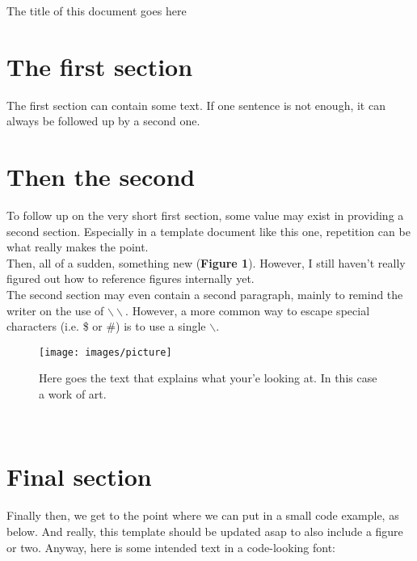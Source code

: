 \documentclass[12pt]{article} %
\begin{document}
\begin{center}
\LARGE{The title of this document goes here}
\end{center}

\vspace{5mm} %

\section*{The first section} %
The first section can contain some text. If one sentence is not enough, it can always be followed up by a second one.\\

\section*{Then the second}
To follow up on the very short first section, some value may exist in providing a second section. Especially in a template document like this one, repetition can be what really makes the point. \\

Then, all of a sudden, something new (\textbf{Figure 1}). However, I still haven't really figured out how to reference figures internally yet.\\

The second section may even contain a second paragraph, mainly to remind the writer on the use of $\backslash\backslash$. However, a more common way to escape special characters (i.e. \$ or \#) is to use a single $\backslash$. \\

\begin{figure}[h]
\captionsetup{labelfont=bf, width=100mm, font=footnotesize}
\texttt{[image: images/picture]}
\centering
\caption{Here goes the text that explains what your'e looking at. In this case a work of art.}
\end{figure} \\

\section*{Final section}
Finally then, we get to the point where we can put in a small code example, as below. And really, this template should be updated asap to also include a figure or two. Anyway, here is some intended text in a code-looking font:\\
\end{document}
